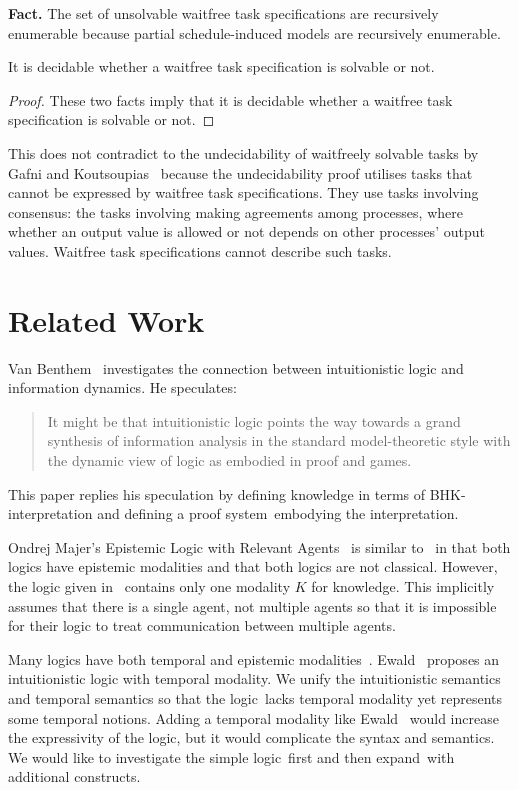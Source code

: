 \noindent \textbf{Fact.} The set of unsolvable waitfree task
specifications are recursively enumerable because partial schedule-induced
models are recursively enumerable.

\begin{theorem}
 \label{wf-dec}
 It is decidable whether a waitfree task
specification is solvable or not.
\end{theorem}
\begin{proof}
These two facts imply that it is decidable whether a waitfree task
specification is solvable or not.
\end{proof}

This does not contradict to the undecidability
 of waitfreely solvable tasks by Gafni and
 Koutsoupias~\cite{gafni1999three}
 because the undecidability proof
utilises tasks that cannot be expressed by waitfree task specifications.
They use tasks involving consensus:
the tasks involving making agreements among processes, where
whether an output value is allowed or not depends on other processes'
output values.  Waitfree task specifications cannot describe such tasks.

\section{Related Work}
\label{first:related}

Van Benthem~\cite{van2009information} investigates the connection between
intuitionistic logic and information dynamics.  He speculates:
\begin{quotation}
It might be
that intuitionistic logic points the way towards a grand synthesis of information analysis
in the standard model-theoretic style with the dynamic view of logic as embodied
in proof and games.
\end{quotation}
This paper replies his speculation by defining knowledge in terms of BHK-interpretation
and defining a proof system \iec\,embodying the interpretation.

Ondrej Majer's 
Epistemic Logic with Relevant Agents~\cite{majer-epistemic}
is similar to \iec\, in that both logics have epistemic modalities and that both logics are
not classical.
However, the logic given in~\cite{majer-epistemic}
 contains only one modality $K$ for knowledge.
This implicitly assumes that there is a single agent, not multiple agents so that it is
impossible for their logic to treat communication between multiple agents.

Many logics have both temporal and epistemic modalities~\cite{sato13study, wozna2005logic}.
Ewald~\cite{1986} proposes an intuitionistic logic with temporal modality.
We unify the intuitionistic semantics and temporal semantics so that the logic
\iec\,lacks temporal modality yet represents some temporal notions.
Adding a temporal modality like Ewald~\cite{1986} would increase the expressivity of the
logic, but it would complicate the syntax and semantics.
We would like to investigate the simple logic \iec\,first
 and then expand \iec\,with
additional constructs.

